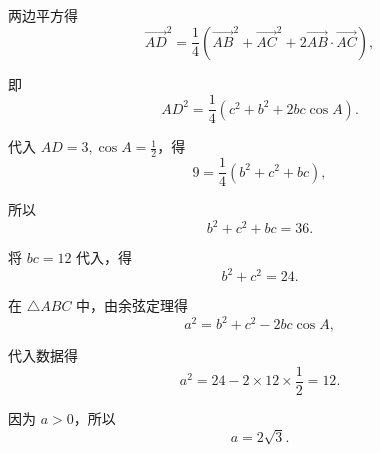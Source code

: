 {  两边平方得
  \[ \overrightarrow{AD}^2 = \frac{1}{4}(\overrightarrow{AB}^2 + \overrightarrow{AC}^2 + 2\overrightarrow{AB}\cdot\overrightarrow{AC}), \]
  
  即
  \[ AD^2 = \frac{1}{4}(c^2 + b^2 + 2bc\cos A). \]
  
  代入 $AD = 3, \cos A = \frac{1}{2}$，得
  \[ 9 = \frac{1}{4}(b^2 + c^2 + bc), \]
  
  所以
  \[ b^2 + c^2 + bc = 36. \]
  
  将 $bc = 12$ 代入，得
  \[ b^2 + c^2 = 24. \]
  
  在 $\triangle ABC$ 中，由余弦定理得
  \[ a^2 = b^2 + c^2 - 2bc\cos A, \]
  
  代入数据得
  \[ a^2 = 24 - 2 \times 12 \times \frac{1}{2} = 12. \]
  
  因为 $a > 0$，所以
  \[ a = 2\sqrt{3}. \]
}

\newcommand{\qTriangleAreaOneDiagnosis}{%
  （留白待收集学生作答后补充）%
}

\newcommand{\qTriangleAreaOneTeachingNotes}{%
  精讲。第(1)问考察边角互化及和差角公式，重点提示 \(\sin C = \sin(A+B)\) 的展开；第(2)问考察中线长公式或向量平方求模，以及面积公式与余弦定理的结合使用。%
}


\newcommand{\qTJWZeroSixThirteenStem}{\qTriangleAreaOneStem}
\newcommand{\qTJWZeroSixThirteenAnswer}{\qTriangleAreaOneAnswer}
\newcommand{\qTJWZeroSixThirteenSolution}{\qTriangleAreaOneSolution}
\newcommand{\qTJWZeroSixThirteenDiagnosis}{\qTriangleAreaOneDiagnosis}
\newcommand{\qTJWZeroSixThirteenTeachingNotes}{\qTriangleAreaOneTeachingNotes}
